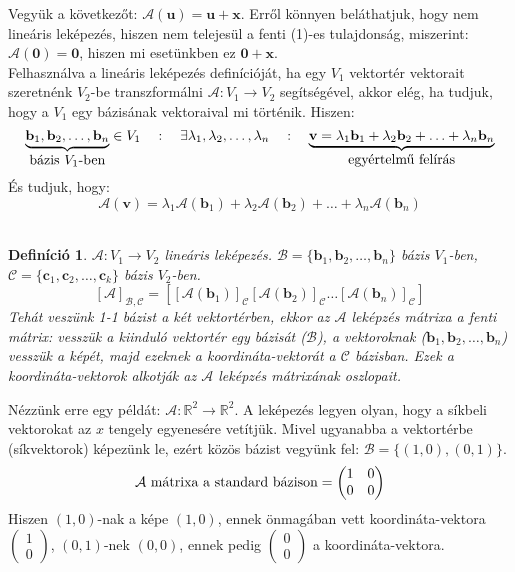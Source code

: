 \documentclass[a4paper,12pt,twoside]{book}
\newcommand{\vek}[1]{\mathbf{#1}} %
\newcommand{\ve}[2]{\mathbf{#1}_{#2}} %
\newcommand{\lista}[2]{{#1}_{1}, {#1}_{2}, \ldots, {#1}_{#2}}
\newcommand{\linkomb}[3]{#2_1\vek{#1}_{1} + #2_2\vek{#1}_{2} + \ldots + #2_{#3}\vek{#1}_{#3}}
\newcommand{\R}{\mathbb{R}}
\newtheorem{defi}{Definíció}[chapter]
\theoremstyle{break}
\begin{document}
Vegyük a következőt: $\mathcal{A}(\vek{u})=\vek{u}+\vek{x}$. Erről könnyen beláthatjuk, hogy nem lineáris leképezés, hiszen nem telejesül a fenti (1)-es tulajdonság, miszerint: $\mathcal{A}(\vek{0}) = \vek{0}$, hiszen mi esetünkben ez $\vek{0}+\vek{x}$.\\

Felhasználva a lineáris leképezés definícióját, ha egy $V_1$ vektortér vektorait szeretnénk $V_2$-be transzformálni $\mathcal{A}:V_1\to V_2$ segítségével, akkor elég, ha tudjuk, hogy a $V_1$ egy bázisának vektoraival mi történik. Hiszen:
\[\underbrace{\lista{\vek{b}}{n}}_{\hbox{bázis $V_1$-ben}} \in V_1 \quad : \quad \exists \lista{\lambda}{n} \quad : \quad \underbrace{\vek{v} = \linkomb{b}{\lambda}{n}}_{\hbox{egyértelmű felírás}}\]
És tudjuk, hogy: 
\[\mathcal{A}(\vek{v}) = \lambda_1\mathcal{A}(\ve{b}{1}) + \lambda_2\mathcal{A}(\ve{b}{2}) + \ldots + \lambda_n\mathcal{A}(\ve{b}{n})\]\\

\begin{defi}
 $\mathcal{A}: V_1 \to V_2$ lineáris leképezés. $\mathcal{B}=\{\ve{b}{1}, \ve{b}{2}, \ldots, \ve{b}{n}\}$ bázis $V_1$-ben, $\mathcal{C}=\{\ve{c}{1}, \ve{c}{2}, \ldots, \ve{c}{k}\}$ bázis $V_2$-ben.
 \[[\mathcal{A}]_{\mathcal{B},\mathcal{C}} = \left[[\mathcal{A}(\ve{b}{1})]_\mathcal{C}[\mathcal{A}(\ve{b}{2})]_\mathcal{C}\ldots[\mathcal{A}(\ve{b}{n})]_\mathcal{C}\right]\]
Tehát veszünk 1-1 bázist a két vektortérben, ekkor az $\mathcal{A}$ \textit{leképzés mátrixa} a fenti mátrix: vesszük a kiinduló vektortér egy bázisát ($\mathcal{B}$), a vektoroknak ($\ve{b}{1},\ve{b}{2},\ldots,\ve{b}{n}$) vesszük a képét, majd ezeknek a koordináta-vektorát a $\mathcal{C}$ bázisban. Ezek a koordináta-vektorok alkotják az $\mathcal{A}$ leképzés mátrixának oszlopait.
\end{defi}

Nézzünk erre egy példát: $\mathcal{A}: \R^2 \to \R^2$. A leképezés legyen olyan, hogy a síkbeli vektorokat az $x$ tengely egyenesére vetítjük. Mivel ugyanabba a vektortérbe (síkvektorok) képezünk le, ezért közös bázist vegyünk fel: $\mathcal{B} = \{(1,0), (0,1)\}$.
\[\mathcal{A} \hbox{ mátrixa a standard bázison} = \begin{pmatrix}
  1 & 0 \\
  0 & 0
\end{pmatrix}
\]
Hiszen $(1,0)$-nak a képe $(1,0)$, ennek önmagában vett koordináta-vektora $\begin{pmatrix}1\\0\end{pmatrix}$, $(0,1)$-nek $(0,0)$, ennek pedig $\begin{pmatrix}0\\0\end{pmatrix}$ a koordináta-vektora.
\end{document}
